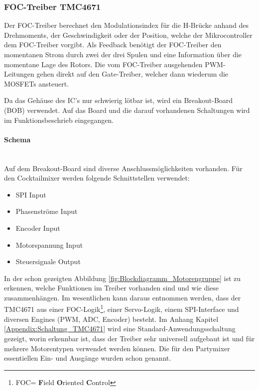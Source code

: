 \subsubsection{FOC-Treiber TMC4671}
\label{subsubsec:FOC-Treiber_TMC4671}

Der FOC-Treiber berechnet den Modulationsindex für die H-Brücke anhand des Drehmoments, der Geschwindigkeit oder der Position, welche der Mikrocontroller dem FOC-Treiber vorgibt. Als Feedback benötigt der FOC-Treiber den momentanen Strom durch zwei der drei Spulen und eine Information über die momentane Lage des Rotors. Die vom FOC-Treiber ausgehenden PWM-Leitungen gehen direkt auf den Gate-Treiber, welcher dann wiederum die MOSFETs ansteuert.

Da das Gehäuse des IC's nur schwierig lötbar ist, wird ein Breakout-Board (BOB) verwendet.
Auf das Board und die darauf vorhandenen Schaltungen wird im Funktionsbeschrieb eingegangen.
\newpage
\paragraph{Schema}\label{par:Schaltungsaufbau_TMC4671}\mbox{}\\

Auf dem Breakout-Board sind diverse Anschlussmöglichkeiten vorhanden. Für den Cocktailmixer werden folgende Schnittstellen verwendet:

\begin{itemize}
\item SPI Input
\item Phasenströme Input
\item Encoder Input
\item Motorspannung Input
\item Steuersignale Output
\end{itemize}

In der schon gezeigten Abbildung \ref{fig:Blockdiagramm_Motorengruppe} ist zu erkennen, welche Funktionen im Treiber vorhanden sind und wie diese zusammenhängen. Im wesentlichen kann daraus entnommen werden, dass der TMC4671 aus einer FOC-Logik\footnote{FOC= \textbf{F}ield \textbf{O}riented \textbf{C}ontrol}, einer Servo-Logik, einem SPI-Interface und diversen Engines (PWM, ADC, Encoder) besteht. Im Anhang Kapitel \ref{Appendix:Schaltung_TMC4671} wird eine Standard-Anwendungsschaltung gezeigt, worin erkennbar ist, dass der Treiber sehr universell aufgebaut ist und für mehrere Motorentypen verwendet werden können. Die für den Partymixer essentiellen Ein- und Ausgänge wurden schon genannt.

